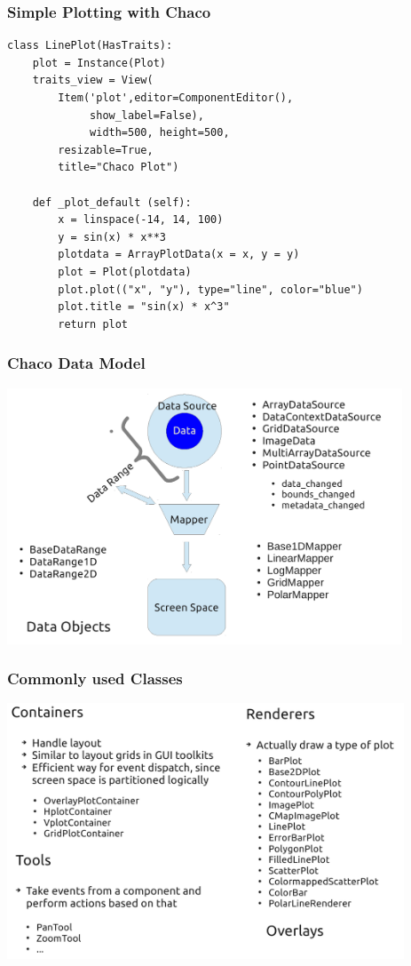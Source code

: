 \documentclass[14pt,compress]{beamer}
\begin{document}
\begin{frame}
\frametitle{Simple Plotting with Chaco}
\footnotesize
\begin{lstlisting}
class LinePlot(HasTraits):
    plot = Instance(Plot)
    traits_view = View(
        Item('plot',editor=ComponentEditor(), 
             show_label=False),
             width=500, height=500,
        resizable=True,
        title="Chaco Plot")

    def _plot_default (self):
        x = linspace(-14, 14, 100)
        y = sin(x) * x**3
        plotdata = ArrayPlotData(x = x, y = y)
        plot = Plot(plotdata)
        plot.plot(("x", "y"), type="line", color="blue")
        plot.title = "sin(x) * x^3"
        return plot
\end{lstlisting}
\end{frame}


\begin{frame}
\frametitle{Chaco Data Model}
\begin{center}
    \includegraphics[height=3in, interpolate=true]{images/chaco_data_model}
\end{center}
\end{frame}

\begin{frame}
\frametitle{Commonly used Classes}
\begin{center}
    \includegraphics[height=3in, interpolate=true]{images/chaco_classes}
\end{center}
\end{frame}
\end{document}
